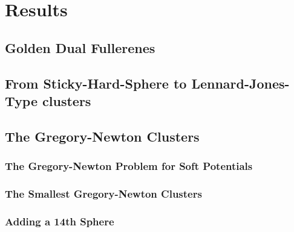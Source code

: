 
\part{Results}
\label{sec:results}

\chapter{Golden Dual Fullerenes}
\label{sec:goldendualfullerenes}

\chapter{From Sticky-Hard-Sphere to Lennard-Jones-Type clusters}
\label{sec:fromstickyhardspheretoLJtypeclusters}

\chapter{The Gregory-Newton Clusters}
\label{sec:thegregorynewtonclusters}

\section{The Gregory-Newton Problem for Soft Potentials}
\label{sec:thegregorynewtonproblemforsoftpotentials}

\section{The Smallest Gregory-Newton Clusters}
\label{sec:themsmallestgregorynewtonclusters}

\section{Adding a 14th Sphere}
\label{sec:addinga14thsphere}
